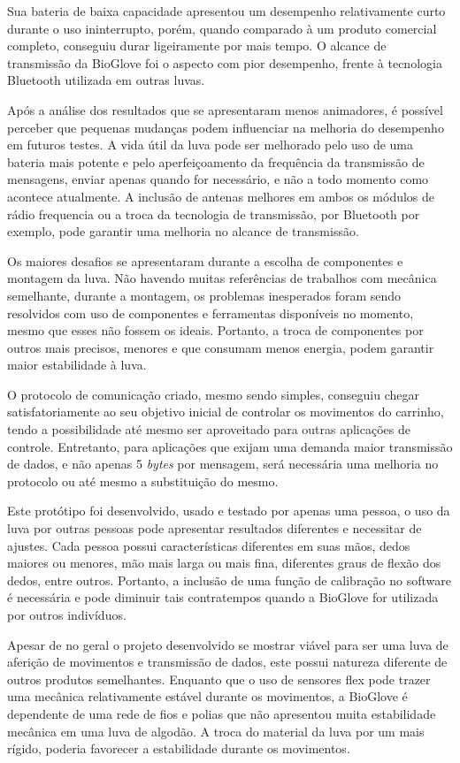 \documentclass[
	12pt,				%
	openright,			%
	oneside,			%
	a4paper,			%
	english,			%
	brazil				%
	]{abntex2}
\begin{document}
		Sua bateria de baixa capacidade apresentou um desempenho relativamente curto durante o uso ininterrupto, porém, quando comparado à um produto comercial completo, conseguiu durar ligeiramente por mais tempo. O alcance de transmissão da BioGlove foi o aspecto com pior desempenho, frente à tecnologia Bluetooth utilizada em outras luvas. 

		Após a análise dos resultados que se apresentaram menos animadores, é possível perceber que pequenas mudanças podem influenciar na melhoria do desempenho em futuros testes. A vida útil da luva pode ser melhorado pelo uso de uma bateria mais potente e pelo aperfeiçoamento da frequência da transmissão de mensagens, enviar apenas quando for necessário, e não a todo momento como acontece atualmente. A inclusão de antenas melhores em ambos os módulos de rádio frequencia ou a troca da tecnologia de transmissão, por Bluetooth por exemplo, pode garantir uma melhoria no alcance de transmissão.

		Os maiores desafios se apresentaram durante a escolha de componentes e montagem da luva. Não havendo muitas referências de trabalhos com mecânica semelhante, durante a montagem, os problemas inesperados foram sendo resolvidos com uso de componentes e ferramentas disponíveis no momento, mesmo que esses não fossem os ideais. Portanto, a troca de componentes por outros mais precisos, menores e que consumam menos energia, podem garantir maior estabilidade à luva.

		O protocolo de comunicação criado, mesmo sendo simples, conseguiu chegar satisfatoriamente ao seu objetivo inicial de controlar os movimentos do carrinho, tendo a possibilidade até mesmo ser aproveitado para outras aplicações de controle. Entretanto, para aplicações que exijam uma demanda maior transmissão de dados, e não apenas 5 \textit{bytes} por mensagem, será necessária uma melhoria no protocolo ou até mesmo a substituição do mesmo.

		Este protótipo foi desenvolvido, usado e testado por apenas uma pessoa, o uso da luva por outras pessoas pode apresentar resultados diferentes e necessitar de ajustes. Cada pessoa possui características diferentes em suas mãos, dedos maiores ou menores, mão mais larga ou mais fina, diferentes graus de flexão dos dedos, entre outros. Portanto, a inclusão de uma função de calibração no software é necessária e pode diminuir tais contratempos quando a BioGlove for utilizada por outros indivíduos.

		Apesar de no geral o projeto desenvolvido se mostrar viável para ser uma luva de aferição de movimentos e transmissão de dados, este possui natureza diferente de outros produtos semelhantes. Enquanto que o uso de sensores flex pode trazer uma mecânica relativamente estável durante os movimentos, a BioGlove é dependente de uma rede de fios e polias que não apresentou muita estabilidade mecânica em uma luva de algodão. A troca do material da luva por um  mais rígido, poderia favorecer a estabilidade durante os movimentos.
\end{document}
